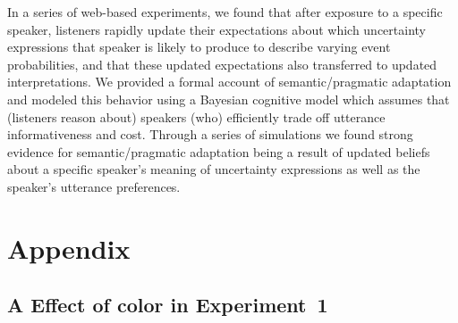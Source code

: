 \documentclass[man, floatsintext]{apa6}
\begin{document}
In a series of web-based experiments, we found that after exposure to a specific speaker, listeners rapidly update 
their expectations about which uncertainty expressions that speaker is likely to produce
to describe varying event probabilities, and that these updated expectations also transferred to updated interpretations.
We provided a formal account of semantic/pragmatic adaptation and modeled this behavior using a Bayesian cognitive model 
which assumes that (listeners reason about) speakers (who) efficiently trade off utterance informativeness and cost.
Through a series of simulations we found strong evidence for semantic/pragmatic adaptation being a result of
updated beliefs about a specific speaker's meaning of uncertainty expressions as well as the speaker's utterance
preferences. 



\printbibliography

\pagebreak


\section*{Appendix}

\subsection*{A Effect of color in Experiment~1}
\end{document}
